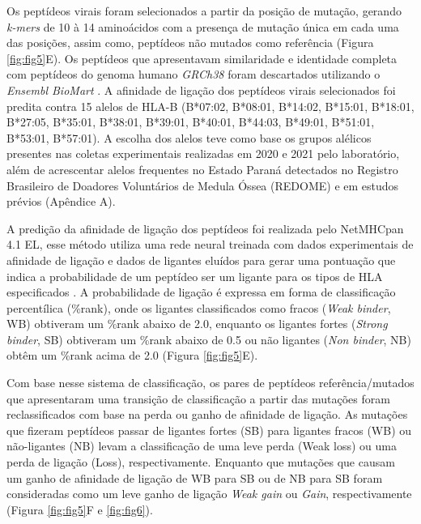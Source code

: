 \begin{justify}
Os peptídeos virais foram selecionados a partir da posição de mutação, gerando \textit{k-mers} de 10 à 14 aminoácidos com a presença de mutação única em cada uma das posições, assim como, peptídeos não mutados como referência (Figura \ref{fig:fig5}E). Os peptídeos que apresentavam similaridade e identidade completa com peptídeos do genoma humano \textit{GRCh38} foram descartados utilizando o \textit{Ensembl BioMart} \cite{Harrison:2024, Kinsella:2011}. A afinidade de ligação dos peptídeos virais selecionados foi predita contra 15 alelos de HLA-B (B*07:02, B*08:01, B*14:02, B*15:01, B*18:01, B*27:05, B*35:01, B*38:01, B*39:01, B*40:01, B*44:03,  B*49:01,  B*51:01, B*53:01, B*57:01). A escolha dos alelos teve como base os grupos alélicos presentes nas coletas experimentais realizadas em 2020  e 2021 pelo laboratório, além de acrescentar alelos frequentes no Estado Paraná detectados no Registro Brasileiro de Doadores Voluntários de Medula Óssea (REDOME) e em estudos prévios (Apêndice A).

A predição da afinidade de ligação dos peptídeos foi realizada pelo NetMHCpan 4.1 EL, esse método utiliza uma rede neural treinada com dados experimentais de afinidade de ligação e dados de ligantes eluídos para gerar uma pontuação que indica a probabilidade de um peptídeo ser um ligante para os tipos de HLA especificados \cite{Reynisson:2020}. A probabilidade de ligação é expressa em forma de classificação percentílica (\%rank), onde os ligantes classificados como fracos (\textit{Weak binder}, WB) obtiveram um \%rank abaixo de 2.0, enquanto os ligantes fortes (\textit{Strong binder}, SB) obtiveram um \%rank abaixo de 0.5 ou não ligantes (\textit{Non binder}, NB) obtêm um \%rank acima de 2.0 (Figura \ref{fig:fig5}E). 

Com base nesse sistema de classificação, os pares de peptídeos referência/mutados que apresentaram uma transição de classificação a partir das mutações foram reclassificados com base na perda ou ganho de afinidade de ligação. As mutações que fizeram peptídeos passar de ligantes fortes (SB) para ligantes fracos (WB) ou não-ligantes (NB) levam a classificação de uma leve perda (Weak loss) ou uma perda de ligação (Loss), respectivamente. Enquanto que mutações que causam um ganho de afinidade de ligação de WB para SB ou de NB para SB foram consideradas como um leve ganho de ligação \textit{Weak gain} ou \textit{Gain}, respectivamente (Figura \ref{fig:fig5}F e \ref{fig:fig6}).


\end{justify}
